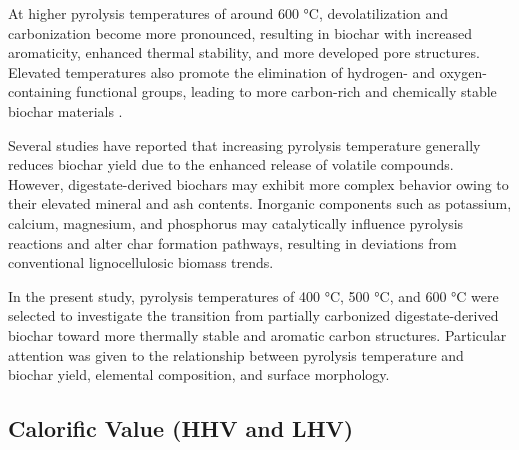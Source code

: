 At higher pyrolysis temperatures of around 600 °C, devolatilization and carbonization become more pronounced, resulting in biochar with increased aromaticity, enhanced thermal stability, and more developed pore structures. Elevated temperatures also promote the elimination of hydrogen- and oxygen-containing functional groups, leading to more carbon-rich and chemically stable biochar materials \cite{kujawska-2026,wystalska-2021}.

\vspace{0.3em}

Several studies have reported that increasing pyrolysis temperature generally reduces biochar yield due to the enhanced release of volatile compounds. However, digestate-derived biochars may exhibit more complex behavior owing to their elevated mineral and ash contents. Inorganic components such as potassium, calcium, magnesium, and phosphorus may catalytically influence pyrolysis reactions and alter char formation pathways, resulting in deviations from conventional lignocellulosic biomass trends\cite{kujawska-2026,wang-2023}.

\vspace{0.3em}

In the present study, pyrolysis temperatures of 400 °C, 500 °C, and 600 °C were selected to investigate the transition from partially carbonized digestate-derived biochar toward more thermally stable and aromatic carbon structures. Particular attention was given to the relationship between pyrolysis temperature and biochar yield, elemental composition, and surface morphology.

\subsection{Calorific Value (HHV and LHV)}
